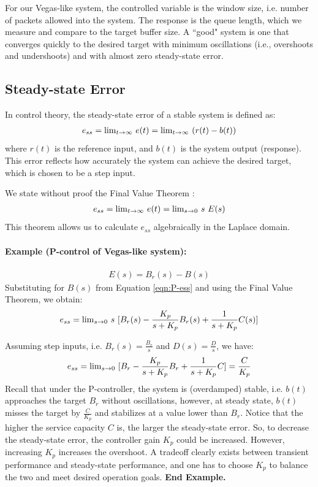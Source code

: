 \documentclass{article}
\def\lm{{\rm lim}}
\begin{document}
For our Vegas-like system,
the controlled variable is the window size, i.e. number of packets
allowed into the system. The response is the queue length, which
we measure and compare to the target  buffer size.
A ``good" system is one that converges quickly to the desired target
with minimum oscillations (i.e., overshoots and undershoots) and
with almost zero steady-state error.


\subsection{Steady-state Error}

In control theory, the steady-state error of a stable system is defined as:
\begin{eqnarray*}
e_{ss} = \lm_{t \rightarrow \infty}\ e(t) = \lm_{t \rightarrow \infty}\  (r(t) - b(t))
\end{eqnarray*}
where $r(t)$ is the reference input, and $b(t)$ is the system output (response).
This error reflects how accurately the system can achieve the desired target,
which is chosen to be a step input.

We state without proof the Final Value Theorem \cite{Ogata:2010}:
\begin{eqnarray*}
e_{ss} = \lm_{t \rightarrow \infty}\ e(t) = \lm_{s \rightarrow 0}\ s\ E(s)
\end{eqnarray*}
This theorem allows us to calculate $e_{ss}$ algebraically in the Laplace domain.

\paragraph{Example (P-control of Vegas-like system):}
\begin{eqnarray*}
E(s) = B_r(s) - B(s)
\end{eqnarray*}
Substituting for $B(s)$ from Equation \ref{eqn:P-ess} and using the Final Value Theorem, we obtain:
\begin{eqnarray*}
e_{ss} = \lm_{s \rightarrow 0}\ s\ [B_r(s) - \frac{K_p}{s + K_p} B_r(s) + \frac{1}{s + K_p} C(s)]
\end{eqnarray*}

Assuming step inputs, i.e. $B_r(s) = \frac{B_r}{s}$ and $D(s) = \frac{D}{s}$, we have:
\begin{eqnarray*}
e_{ss} = \lm_{s \rightarrow 0}\ [B_r - \frac{K_p}{s + K_p} B_r + \frac{1}{s + K_p} C] = \frac{C}{K_p}
\end{eqnarray*}
Recall that under the P-controller, the system is (overdamped) stable, i.e. 
$b(t)$ approaches the target $B_r$ without oscillations, however,
at steady state, $b(t)$ misses the target by $\frac{C}{K_p}$ and 
stabilizes at a value lower than $B_r$.
Notice that the higher the service capacity $C$ is, the larger the steady-state error.
So, to decrease the steady-state error, the controller gain $K_p$ could be increased.
However, increasing $K_p$ increases the overshoot.
A tradeoff clearly exists between transient performance and steady-state performance,
and one has to choose $K_p$ to balance the two and meet desired operation goals.
 {\bf  End Example.}
\end{document}
